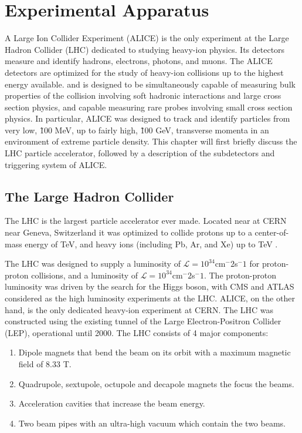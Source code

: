 \chapter{Experimental Apparatus} 
A Large Ion Collider Experiment (ALICE) is the only experiment at the Large Hadron Collider (LHC) dedicated to studying heavy-ion physics. Its detectors measure and identify hadrons, electrons, photons, and muons. The ALICE detectors are optimized for the study of heavy-ion collisions up to the highest energy available. and is designed to be simultaneously capable of measuring  bulk properties of the collision involving soft hadronic interactions and large cross section physics, and capable measuring rare probes involving small cross section physics. In particular, ALICE was designed to track and identify particles from very low,  \~100 MeV, up to fairly high, \~100 GeV, transverse momenta in an environment of extreme particle density. This chapter will first briefly discuss the LHC particle accelerator, followed by a description of the subdetectors and triggering system of ALICE.

\section{The Large Hadron Collider} 
\label{sec:LHC}
The LHC is the largest particle accelerator ever made. Located near at CERN near Geneva, Switzerland  it was optimized to collide protons up to a center-of-mass energy of  TeV, and heavy ions (including Pb, Ar, and Xe) up to  TeV \cite{Evans2008}.

The LHC was designed to supply a luminosity of $\mathcal{L}=10^{34}$cm$^-2$s$^-1$ for proton-proton collisions, and a luminosity of $\mathcal{L}=10^{34}$cm$^-2$s$^-1$. The proton-proton luminosity was driven by the search for the Higgs boson, with CMS and ATLAS considered as the high luminosity experiments at the LHC. ALICE, on the other hand, is the only dedicated heavy-ion experiment at CERN. The LHC was constructed using the existing tunnel of the Large Electron-Positron Collider (LEP), operational until 2000. The LHC consists of 4 major components:

\begin{enumerate}
	\item Dipole magnets that bend the beam on its orbit with a maximum magnetic field of 8.33 T. 
	\item Quadrupole, sextupole, octupole and decapole magnets the focus the beams.
	\item Acceleration cavities that increase the beam energy.
	\item Two beam pipes with an ultra-high vacuum  which contain the two beams.
\end{enumerate}

